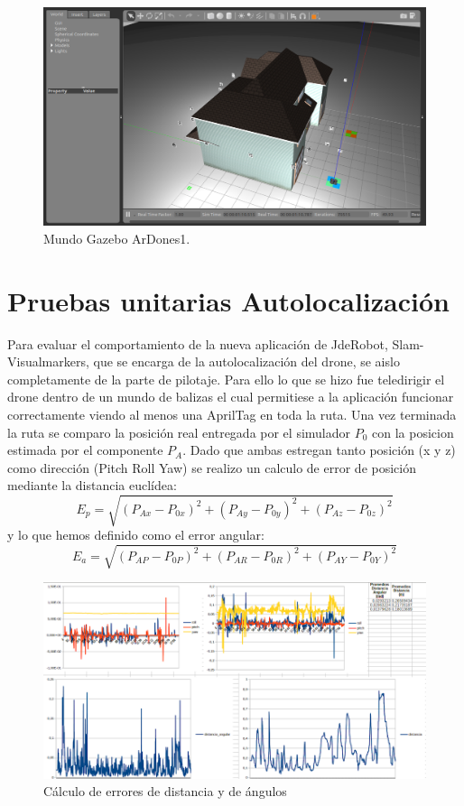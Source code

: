 \begin{figure}[H]
	\begin{center}
		\includegraphics[width=1\textwidth]{imag/IMG28.png}
				\caption{Mundo Gazebo ArDones1.}
		\label{fig:Mundo Gazebo.}	
	\end{center}
\end{figure}


\section{Pruebas unitarias Autolocalización}
\hspace{1cm} Para evaluar el comportamiento de la nueva aplicación de JdeRobot, Slam-Visualmarkers, que se encarga de la autolocalización del drone, se aislo completamente de la parte de pilotaje. Para ello lo que se hizo fue teledirigir el drone dentro de un mundo de balizas el cual permitiese a la aplicación funcionar correctamente viendo al menos una AprilTag en toda la ruta. Una vez terminada la ruta se comparo la posición real entregada por el simulador $P_{0}$ con la posicion estimada por el componente $P_{A} $. Dado que ambas estregan tanto posición (x y z) como dirección (Pitch Roll Yaw) se realizo un calculo de error de posición mediante la distancia euclídea: 
\[ E_{p} = \sqrt{(P_{Ax}-P_{0x})^{2}+(P_{Ay}-P_{0y})^{2}+(P_{Az}-P_{0z})^{2}}\]
y lo que hemos definido como el error angular:    
\[ E_{a} = \sqrt{(P_{AP}-P_{0P})^{2}+(P_{AR}-P_{0R})^{2}+(P_{AY}-P_{0Y})^{2}}\]

\begin{figure}[H]
	\begin{center}
		\includegraphics[width=1\textwidth]{imag/IMG36.png}
				\caption{Cálculo de errores de distancia y de ángulos}
		\label{fig:Error de distancia y de giro.}	
	\end{center}
\end{figure}

